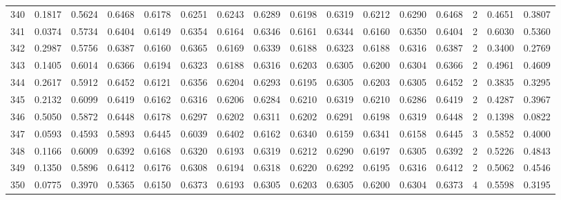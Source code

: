 \begin{tabular}{lrrrrrrrrrrrrrrr}
340 &      0.1817 &  0.5624 &  0.6468 &  0.6178 &  0.6251 &  0.6243 &  0.6289 &  0.6198 &  0.6319 &  0.6212 &   0.6290 &     0.6468 &      2 &                    0.4651 &                     0.3807 \\
341 &      0.0374 &  0.5734 &  0.6404 &  0.6149 &  0.6354 &  0.6164 &  0.6346 &  0.6161 &  0.6344 &  0.6160 &   0.6350 &     0.6404 &      2 &                    0.6030 &                     0.5360 \\
342 &      0.2987 &  0.5756 &  0.6387 &  0.6160 &  0.6365 &  0.6169 &  0.6339 &  0.6188 &  0.6323 &  0.6188 &   0.6316 &     0.6387 &      2 &                    0.3400 &                     0.2769 \\
343 &      0.1405 &  0.6014 &  0.6366 &  0.6194 &  0.6323 &  0.6188 &  0.6316 &  0.6203 &  0.6305 &  0.6200 &   0.6304 &     0.6366 &      2 &                    0.4961 &                     0.4609 \\
344 &      0.2617 &  0.5912 &  0.6452 &  0.6121 &  0.6356 &  0.6204 &  0.6293 &  0.6195 &  0.6305 &  0.6203 &   0.6305 &     0.6452 &      2 &                    0.3835 &                     0.3295 \\
345 &      0.2132 &  0.6099 &  0.6419 &  0.6162 &  0.6316 &  0.6206 &  0.6284 &  0.6210 &  0.6319 &  0.6210 &   0.6286 &     0.6419 &      2 &                    0.4287 &                     0.3967 \\
346 &      0.5050 &  0.5872 &  0.6448 &  0.6178 &  0.6297 &  0.6202 &  0.6311 &  0.6202 &  0.6291 &  0.6198 &   0.6319 &     0.6448 &      2 &                    0.1398 &                     0.0822 \\
347 &      0.0593 &  0.4593 &  0.5893 &  0.6445 &  0.6039 &  0.6402 &  0.6162 &  0.6340 &  0.6159 &  0.6341 &   0.6158 &     0.6445 &      3 &                    0.5852 &                     0.4000 \\
348 &      0.1166 &  0.6009 &  0.6392 &  0.6168 &  0.6320 &  0.6193 &  0.6319 &  0.6212 &  0.6290 &  0.6197 &   0.6305 &     0.6392 &      2 &                    0.5226 &                     0.4843 \\
349 &      0.1350 &  0.5896 &  0.6412 &  0.6176 &  0.6308 &  0.6194 &  0.6318 &  0.6220 &  0.6292 &  0.6195 &   0.6316 &     0.6412 &      2 &                    0.5062 &                     0.4546 \\
350 &      0.0775 &  0.3970 &  0.5365 &  0.6150 &  0.6373 &  0.6193 &  0.6305 &  0.6203 &  0.6305 &  0.6200 &   0.6304 &     0.6373 &      4 &                    0.5598 &                     0.3195 \\

\end{tabular}
